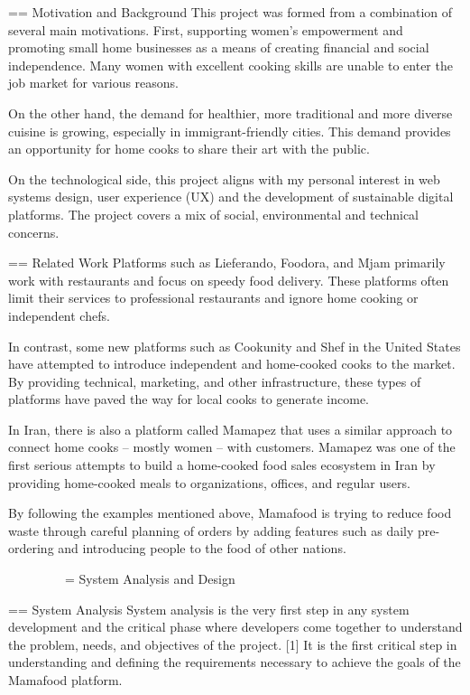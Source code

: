 == Motivation and Background
This project was formed from a combination of several main motivations. First, supporting women’s empowerment and promoting small home businesses as a means of creating financial and social independence. Many women with excellent cooking skills are unable to enter the job market for various reasons.

On the other hand, the demand for healthier, more traditional and more diverse cuisine is growing, especially in immigrant-friendly cities. This demand provides an opportunity for home cooks to share their art with the public.

On the technological side, this project aligns with my personal interest in web systems design, user experience (UX) and the development of sustainable digital platforms. The project covers a mix of social, environmental and technical concerns.

== Related Work
Platforms such as Lieferando, Foodora, and Mjam primarily work with restaurants and focus on speedy food delivery. These platforms often limit their services to professional restaurants and ignore home cooking or independent chefs.

In contrast, some new platforms such as Cookunity and Shef in the United States have attempted to introduce independent and home-cooked cooks to the market. By providing technical, marketing, and other infrastructure, these types of platforms have paved the way for local cooks to generate income.

In Iran, there is also a platform called Mamapez that uses a similar approach to connect home cooks – mostly women – with customers. Mamapez was one of the first serious attempts to build a home-cooked food sales ecosystem in Iran by providing home-cooked meals to organizations, offices, and regular users.

By following the examples mentioned above, Mamafood is trying to reduce food waste through careful planning of orders by adding features such as daily pre-ordering and introducing people to the food of other nations.
\
\

\
\
\
\
\
\
\
\
\
= System Analysis and Design

== System Analysis
System analysis is the very first step in any system development and the critical phase where developers come together to understand the problem, needs, and objectives of the project. [1]
It is the first critical step in understanding and defining the requirements necessary to achieve the goals of the Mamafood platform.

